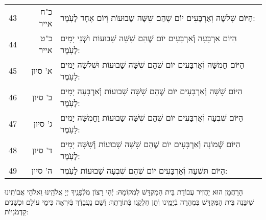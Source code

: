 \documentclass[twoside, openany, parskip=half, 11pt]{book}
\begin{document}
\begin{scriptsize}
\begin{longtable}{ l | r | p{} }
43 & כ"ח אייר & הַיּוֹם שְֿׁלֹשָׁה וְֿאַרְבָּעִים יוֹם שֶׁהֵם שִׁשָּׁה שָׁבוּעוֹת וְֿיוֹם אֶחָד לָעֹֽמֶר: \\
44 & כ"ט אייר & הַיּוֹם אַרְבָּעָה וְֿאַרְבָּעִים יוֹם שֶׁהֵם שִׁשָּׁה שָׁבוּעוֹת וּשְׁנֵי יָמִים לָעֹֽמֶר: \\
45 & א' סיון & הַיּוֹם חֲמִשָּׁה וְֿאַרְבָּעִים יוֹם שֶׁהֵם שִׁשָּׁה שָׁבוּעוֹת וּשְׁלֹשָׁה יָמִים לָעֹֽמֶר: \\
46 & ב' סיון & הַיּוֹם שִׁשָּׁה וְֿאַרְבָּעִים יוֹם שֶׁהֵם שִׁשָּׁה שָׁבוּעוֹת וְֿאַרְבָּעָה יָמִים לָעֹֽמֶר: \\
47 & ג' סיון & הַיּוֹם שִׁבְעָה וְֿאַרְבָּעִים יוֹם שֶׁהֵם שִׁשָּׁה שָבוּעוֹת וַחֲמִשָּׁה יָמִים לָעֹֽמֶר: \\
48 & ד' סיון & הַיּוֹם שְֿׁמוֹנָה וְֿאַרְבָּעִים יוֹם שֶׁהֵם שִׁשָּׁה שָׁבוּעוֹת וְֿשִׁשָּׁה יָמִים לָעֹֽמֶר: \\
49 & ה' סיון & הַיּוֹם תִּשְׁעָה וְֿאַרְבָּעִים יוֹם שֶׁהֵם שִׁבְעָה שָׁבוּעוֹת לָעֹֽמֶר:
\end{longtable}
\end{scriptsize}



הָרַחֲמָן הוּא יַחֲזִיר עֲבוֹדַת בֵּית הַמִקְדָּשׁ לִמְקוֹמָהּ:
יְֿהִי רָצוֹן מִלְּֿפָנֶֽיךָ יְיָ אֱלֹהֵֽינוּ וֵאלֹהֵי אֲבוֹתֵֽינוּ שֶׁיִבָּנֶה בֵּית הַמִּקְדָּשׁ בִּמְהֵרָה בְֿיָמֵֽינוּ וְֿתֵן חֶלְקֵֽנוּ בְּֿתוֹרָתֶֽךָ: וְֿשָׁם נַעֲבָדְֿךָ בְּֿיִרְאָה כִּימֵי עוֹלָם וּכְשָׁנִים קַדְמֹנִיּוֹת:
\end{document}

